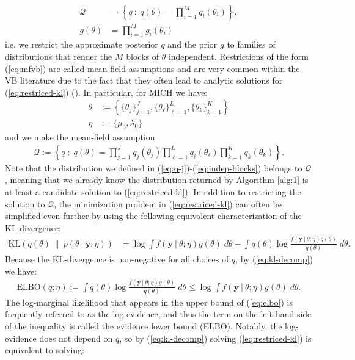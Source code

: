 \begin{align} 
    \mathcal{Q} &= \left\{q \::\: q(\theta) = \prod_{i=1}^M q_i(\theta_i)\right\}, \label{eq:mfvb} \\
    g(\theta) &= \prod_{i=1}^M g_i(\theta_i) \label{eq:ind-prior}
\end{align}
i.e. we restrict the approximate posterior $q$ and the prior $g$ to families of distributions that render the $M$ blocks of $\theta$ independent. Restrictions of the form (\ref{eq:mfvb}) are called mean-field assumptions and are very common within the VB literature due to the fact that they often lead to analytic solutions for (\ref{eq:restriced-kl}) (\citealp{Wainwright08}). In particular, for MICH we have:
\begin{align}
    \theta &:= \left\{\{\theta_j\}_{j=1}^J, \{\theta_\ell\}_{\ell=1}^L,\{\theta_k\}_{k=1}^K\right\} \\
    \eta &:= \{\mu_0,\lambda_0\}
\end{align}
and we make the mean-field assumption:
\begin{align}
    \mathcal{Q} := \left\{q \;:\; q\left(\theta\right) = \prod_{j=1}^J q_j(\theta_j) \prod_{\ell=1}^L q_\ell(\theta_\ell)\prod_{k=1}^K q_k(\theta_k)\right\}.\label{eq:mean-field}
\end{align}
Note that the distribution we defined in (\ref{eq:q-j})-(\ref{eq:indep-blocks}) belongs to $\mathcal{Q}$, meaning that we already know the distribution returned by Algorithm \ref{alg:1} is at least a candidate solution to (\ref{eq:restriced-kl}). In addition to restricting the solution to $\mathcal{Q}$, the minimization problem in (\ref{eq:restriced-kl}) can often be simplified even further by using the following equivalent characterization of the KL-divergence: 
\begin{align}
     \text{KL}( q(\theta) \:\lVert\: p(\theta\:|\: \mathbf{y};\eta)) &= \log \int f(\mathbf{y}\:|\:\theta;\eta)g(\theta)\;d\theta - \int q(\theta) \log \frac{ f(\mathbf{y}\:|\: \theta;\eta) g(\theta)}{q(\theta)} \; d\theta. \label{eq:kl-decomp} 
\end{align}
Because the KL-divergence is non-negative for all choices of $q$, by (\ref{eq:kl-decomp}) we have:
\begin{align}\label{eq:elbo}
    \text{ELBO}(q;\eta) := \int q(\theta) \log \frac{ f(\mathbf{y}\:|\: \theta;\eta) g(\theta)}{q(\theta)} \; d\theta \leq \log \int f(\mathbf{y}\:|\:\theta;\eta)g(\theta)\;d\theta.
\end{align}
The log-marginal likelihood that appears in the upper bound of (\ref{eq:elbo}) is frequently referred to as the log-evidence, and thus the term on the left-hand side of the inequality is called the evidence lower bound (ELBO). Notably, the log-evidence does not depend on $q$, so by (\ref{eq:kl-decomp}) solving (\ref{eq:restriced-kl}) is equivalent to solving: 
